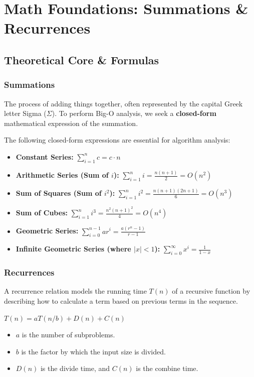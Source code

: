 \chapter{Math Foundations: Summations \& Recurrences}

\section{Theoretical Core \& Formulas}

\subsection{Summations}
The process of adding things together, often represented by the capital Greek letter Sigma ($\Sigma$). To perform Big-O analysis, we seek a \textbf{closed-form} mathematical expression of the summation.

\begin{theorem}
The following closed-form expressions are essential for algorithm analysis:
\begin{itemize}
    \item \textbf{Constant Series:} $\sum_{i=1}^n c = c \cdot n$
    \item \textbf{Arithmetic Series (Sum of $i$):} $\sum_{i=1}^n i = \frac{n(n+1)}{2} = O(n^2)$
    \item \textbf{Sum of Squares (Sum of $i^2$):} $\sum_{i=1}^n i^2 = \frac{n(n+1)(2n+1)}{6} = O(n^3)$
    \item \textbf{Sum of Cubes:} $\sum_{i=1}^n i^3 = \frac{n^2(n+1)^2}{4} = O(n^4)$
    \item \textbf{Geometric Series:} $\sum_{i=0}^{n-1} a r^i = \frac{a(r^n - 1)}{r - 1}$
    \item \textbf{Infinite Geometric Series (where $|x| < 1$):} $\sum_{i=0}^\infty x^i = \frac{1}{1-x}$
\end{itemize}
\end{theorem}

\subsection{Recurrences}
A recurrence relation models the running time $T(n)$ of a recursive function by describing how to calculate a term based on previous terms in the sequence.

\begin{definition}
$T(n) = aT(n/b) + D(n) + C(n)$
\begin{itemize}
    \item $a$ is the number of subproblems.
    \item $b$ is the factor by which the input size is divided.
    \item $D(n)$ is the divide time, and $C(n)$ is the combine time.
\end{itemize}
\end{definition}

